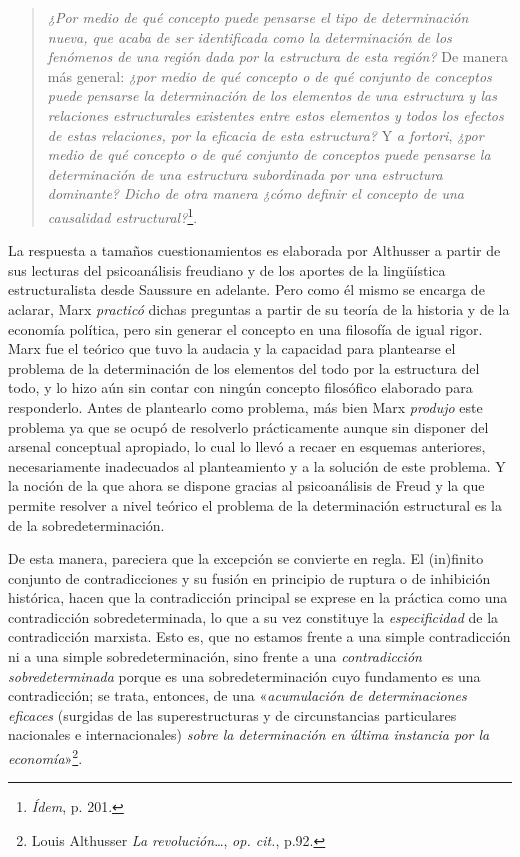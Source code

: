 \begin{quote}
\emph{¿Por medio de qué concepto puede pensarse el tipo de determinación nueva, que acaba de ser identificada como la determinación de los fenómenos de una región dada por la estructura de esta región?} De manera más general: \emph{¿por medio de qué concepto o de qué conjunto de conceptos puede pensarse la determinación de los elementos de una estructura y las relaciones estructurales existentes entre estos elementos y todos los efectos de estas relaciones, por la eficacia de esta estructura?} Y \emph{a fortori}, \emph{¿por medio de qué concepto o de qué conjunto de conceptos puede pensarse la determinación de una estructura subordinada por una estructura dominante? Dicho de otra manera ¿cómo definir el concepto de una causalidad estructural?}\footnote{\emph{Ídem}, p. 201.}.
\end{quote}

La respuesta a tamaños cuestionamientos es elaborada por Althusser a partir de sus lecturas del psicoanálisis freudiano y de los aportes de la lingüística estructuralista desde Saussure en adelante. Pero como él mismo se encarga de aclarar, Marx \emph{practicó} dichas preguntas a partir de su teoría de la historia y de la economía política, pero sin generar el concepto en una filosofía de igual rigor. Marx fue el teórico que tuvo la audacia y la capacidad para plantearse el problema de la determinación de los elementos del todo por la estructura del todo, y lo hizo aún sin contar con ningún concepto filosófico elaborado para responderlo. Antes de plantearlo como problema, más bien Marx \emph{produjo} este problema ya que se ocupó de resolverlo prácticamente aunque sin disponer del arsenal conceptual apropiado, lo cual lo llevó a recaer en esquemas anteriores, necesariamente inadecuados al planteamiento y a la solución de este problema. Y la noción de la que ahora se dispone gracias al psicoanálisis de Freud y la que permite resolver a nivel teórico el problema de la determinación estructural es la de la sobredeterminación.

De esta manera, pareciera que la excepción se convierte en regla. El (in)finito conjunto de contradicciones y su fusión en principio de ruptura o de inhibición histórica, hacen que la contradicción principal se exprese en la práctica como una contradicción sobredeterminada, lo que a su vez constituye la \emph{especificidad} de la contradicción marxista. Esto es, que no estamos frente a una simple contradicción ni a una simple sobredeterminación, sino frente a una \emph{contradicción sobredeterminada} porque es una sobredeterminación cuyo fundamento es una contradicción; se trata, entonces, de una «\emph{acumulación de determinaciones eficaces} (surgidas de las superestructuras y de circunstancias particulares nacionales e internacionales) \emph{sobre la determinación en última instancia por la economía}»\footnote{Louis Althusser \emph{La revolución}\ldots, \emph{op. cit.}, p.92.}.

